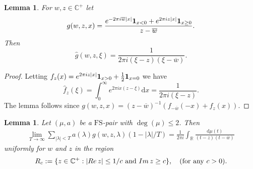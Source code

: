 \documentclass[a4paper,reqno,12pt]{amsart}
\newtheorem{lemma}[theorem]{Lemma}
\renewcommand{\H}{\mathbb{C}^+}
\renewcommand{\r}{\mathbb{R}}
\newcommand{\ft}{\widehat}
\newcommand{\la}{\lambda}
\renewcommand{\d}{\mathrm{d}}
\newcommand{\w}{\ov{w}}
\newcommand{\1}{{\bf 1}}
\newcommand{\fs}{\mathrm{FS}}
\newcommand{\ov}[1]{\overline{#1}}
\renewcommand{\1}{{\bo 1}}
\renewcommand{\Re}{{\rm Re}\,}
\renewcommand{\Im}{{\rm Im}\,}
\begin{document}
\begin{lemma}
 For $w,z\in \H$ let
\begin{align}\label{gspecial}
g(w,z,x)=\frac{e^{-2\pi i \w |x|}\1_{x<0} + e^{2\pi i z |x|}\1_{x\geq 0}}{z-\w}.
\end{align}
Then 
$$
\ft g(w,z,\xi) =\frac{1}{2\pi i(\xi-z)(\xi-\w)}.
$$
\end{lemma}
\begin{proof}
Letting $f_z(x) = e^{2\pi i z |x|}\1_{x> 0} + \frac{1}{2}\1_{x=0}$ we have
$$
\ft f_z(\xi) = \int_0^\infty e^{2\pi i x(z-\xi)}\d x = \frac{1}{2\pi i (\xi-z)}.
$$
The lemma follows since $g(w,z,x) = (z-\w)^{-1}(f_{-\w}(-x)+f_z(x))$.
\end{proof}

\begin{lemma}\label{lem:limexist}
Let $(\mu,a)$ be a $\fs$-pair with $\deg(\mu)\leq 2$. Then 
\begin{align}\label{crucialid}
\lim_{T\to\infty} \sum_{|\la|<T}a(\la)g(w,z,\la)(1-|\la|/T) = \frac{1}{2\pi i}\int_\r  \frac{\d \mu(t)}{(t-z)(t-\w)}
\end{align}
uniformly for $w$ and $z$ in the region
$$
R_c:=\{z\in \H : |\Re z| \leq  1/c \text{ and } \Im z \geq c\}, \quad (\text{for any } c>0).
$$
\end{lemma}
\end{document}
